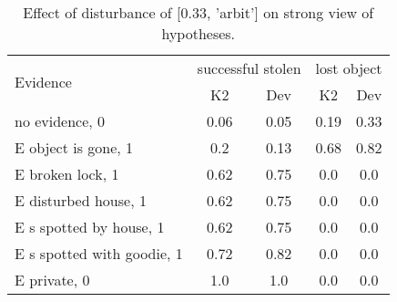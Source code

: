 \begin{table}\begin{tabular}{l|cc|cc}\toprule\multirow{2}{*}{Evidence} & \multicolumn{2}{c}{successful stolen}& \multicolumn{2}{c}{lost object}\\& {K2} & {Dev}& {K2} & {Dev}\\\midrule
no evidence, 0 & 0.06&0.05&\cellcolor{Bittersweet}0.19&\cellcolor{Bittersweet}0.33\\E object is gone, 1 & \cellcolor{Bittersweet}0.2&\cellcolor{Bittersweet}0.13&\cellcolor{Bittersweet}0.68&\cellcolor{Bittersweet}0.82\\E broken lock, 1 & \cellcolor{Bittersweet}0.62&\cellcolor{Bittersweet}0.75&0.0&0.0\\E disturbed house, 1 & \cellcolor{Bittersweet}0.62&\cellcolor{Bittersweet}0.75&0.0&0.0\\E s spotted by house, 1 & \cellcolor{Bittersweet}0.62&\cellcolor{Bittersweet}0.75&0.0&0.0\\E s spotted with goodie, 1 & \cellcolor{Bittersweet}0.72&\cellcolor{Bittersweet}0.82&0.0&0.0\\E private, 0 & 1.0&1.0&0.0&0.0\\\bottomrule\end{tabular}\caption{Effect of disturbance of [0.33, 'arbit'] on strong view of hypotheses.}\end{table}